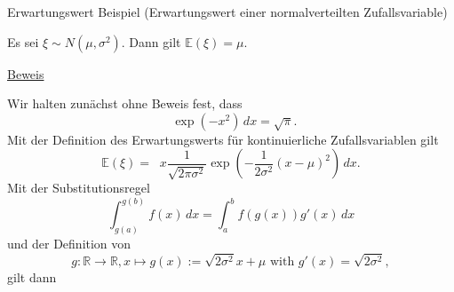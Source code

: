 \documentclass[
  8pt,
  ignorenonframetext,
]{beamer}
\DeclareMathOperator*{\intinf}{\int_{-\infty}^{\infty}}
\begin{document}
\begin{frame}{Erwartungswert}
\protect\hypertarget{erwartungswert-2}{}
Beispiel (Erwartungswert einer normalverteilten Zufallsvariable)
\vspace{2mm}

\small

Es sei \(\xi \sim N(\mu,\sigma^2)\). Dann gilt
\(\mathbb{E}(\xi) = \mu\).

\vspace{2mm}

\footnotesize

\underline{Beweis} \vspace{1mm}

Wir halten zunächst ohne Beweis fest, dass \begin{equation}
\intinf \exp(-x^2)\,dx = \sqrt{\pi}.
\end{equation} Mit der Definition des Erwartungswerts für
kontinuierliche Zufallsvariablen gilt \begin{equation}
\mathbb{E}(\xi)
= \intinf x \frac{1}{\sqrt{2\pi\sigma^2}}\exp\left(-\frac{1}{2\sigma^2}(x - \mu)^2\right) \,dx.
\end{equation} Mit der Substitutionsregel \begin{equation}
\int_{g(a)}^{g(b)} f(x)\,dx = \int_a^b f(g(x))g'(x)\,dx
\end{equation} und der Definition von \begin{equation}
g : \mathbb{R} \to \mathbb{R}, x \mapsto g(x) := \sqrt{2\sigma^2}x + \mu
\mbox{ with } g'(x) = \sqrt{2\sigma^2},
\end{equation} gilt dann
\end{frame}
\end{document}
